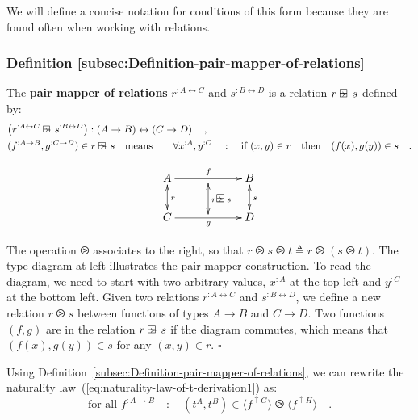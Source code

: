 We will define a concise notation for conditions of this form because
they are found often when working with relations.

\subsubsection{Definition \label{subsec:Definition-pair-mapper-of-relations}\ref{subsec:Definition-pair-mapper-of-relations}}

The \textbf{pair mapper of relations}
$r^{:A\leftrightarrow C}$ and $s^{:B\leftrightarrow D}$ is a relation
$r\varogreaterthan s$ defined by:
\begin{align*}
 & \big(r^{:A\leftrightarrow C}\varogreaterthan s^{:B\leftrightarrow D}\big):\left(A\rightarrow B\right)\leftrightarrow\left(C\rightarrow D\right)\quad,\\
 & (f^{:A\rightarrow B},g^{:C\rightarrow D})\in r\varogreaterthan s\quad\text{means}\quad\quad\forall x^{:A},y^{:C}\quad:\quad\text{if }(x,y)\in r\quad\text{then}\quad(f(x),g(y))\in s\quad.
\end{align*}

\begin{wrapfigure}{i}{0.2\columnwidth}%
\vspace{-2.8\baselineskip}
\[
\xymatrix{\xyScaleY{1.8pc}\xyScaleX{2.2pc}A\ar@{<->}[d]\sp(0.5){r}\ar[rr]\sp(0.5){f} & \ar@{<->}[d(0.9)]\sp(0.55){r\varogreaterthan s} & B\ar@{<->}[d]\sp(0.5){s}\\
C\ar[rr]\sb(0.5){g} &  & D
}
\]

\vspace{-2.5\baselineskip}
\end{wrapfigure}%

\noindent The operation $\ogreaterthan$ associates to the right,
so that $r\ogreaterthan s\ogreaterthan t\triangleq r\ogreaterthan\left(s\ogreaterthan t\right)$.
The type diagram at left illustrates the pair mapper construction.
To read the diagram, we need to start with two arbitrary values, $x^{:A}$
at the top left and $y^{:C}$ at the bottom left. Given two relations
$r^{:A\leftrightarrow C}$ and $s^{:B\leftrightarrow D}$, we define
a new relation $r\ogreaterthan s$ between functions of types $A\rightarrow B$
and $C\rightarrow D$. Two functions $\left(f,g\right)$ are in the
relation $r\varogreaterthan s$ if the diagram commutes, which means
that $(f(x),g(y))\in s$ for any $(x,y)\in r$. $\square$

Using Definition~\ref{subsec:Definition-pair-mapper-of-relations},
we can rewrite the naturality law~(\ref{eq:naturality-law-of-t-derivation1})
as:
\[
\text{for all }f^{:A\rightarrow B}\quad:\quad(t^{A},t^{B})\in\langle f^{\uparrow G}\rangle\ogreaterthan\langle f^{\uparrow H}\rangle\quad.
\]

